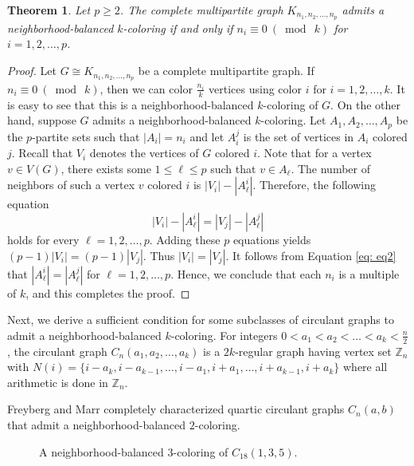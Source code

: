 \documentclass[12pt]{article}
\newtheorem{theorem}{Theorem}[section]
\newcommand{\nbc}{neighborhood-balanced $k$-coloring\xspace}
\begin{document}
\begin{theorem}\label{th:multipartite}
Let $p \geq 2$.
The complete multipartite graph $K_{n_1,n_2,\dots,n_p}$ admits a \nbc if and only if $n_i\equiv 0\ (\bmod\ k)$ for $i=1,2, \dots, p$.
\end{theorem}
\begin{proof}
    Let $G \cong K_{n_1,n_2,\dots,n_p}$ be a complete multipartite graph. 
    If $n_i \equiv 0\ (\bmod\ k)$, then we can color $\tfrac{n_i}{k}$ vertices using color $i$ for $i = 1, 2, \dots, k$.
    It is easy to see that this is a \nbc of $G$.
    On the other hand, suppose $G$ admits a \nbc. Let $A_1,A_2,\dots, A_p$ be the $p$-partite sets such that $|A_i|=n_i$ and let $A_{i}^{j}$ is the set of vertices in $A_i$ colored $j$.
    Recall that $V_i$ denotes the vertices of $G$ colored $i$.
    Note that for a vertex $v \in V(G)$, there exists some $1 \le \ell \le p$ such that $v \in A_{\ell}$.
    The number of neighbors of such a vertex $v$ colored $i$ is $|V_i| - |A_{\ell}^{i}|$.
    Therefore, the following equation
    \begin{equation}\label{eq: eq2}
        |V_i| - |A_{\ell}^{i}| = |V_j| - |A_{\ell}^{j}|
    \end{equation}
    holds for every $\ell = 1, 2,  \dots, p$.
    Adding these $p$ equations yields $(p-1) |V_i| =(p-1) |V_j|$.
    Thus $|V_i| = |V_j|$.
    It follows from Equation \ref{eq: eq2} that $|A_{\ell}^{i}| = |A_{\ell}^{j}|$ for $\ell = 1, 2, \dots, p$.
    Hence, we conclude that each $n_i$ is a multiple of $k$, and this completes the proof.
\end{proof}

Next, we derive a sufficient condition for some subclasses of circulant graphs to admit a \nbc.
For integers $0 < a_1 < a_2 < \dots <a_k< \frac{n}{2}$, the circulant graph $C_n(a_1,a_2,\dots,a_k)$ is a $2k$-regular graph having vertex set $\mathbb{Z}_n$ with $N(i)=\{i-a_k, i-a_{k-1},\dots,i-a_1, i+a_1, \dots, i+a_{k-1},i+a_k \}$ where all arithmetic is done in $\mathbb{Z}_n$.
\par
Freyberg and Marr \cite{nbc} completely characterized quartic circulant graphs $C_n(a,b)$ that admit a neighborhood-balanced $2$-coloring.

\begin{figure}[htbp]
\centering

\caption{A neighborhood-balanced $3$-coloring of $C_{18}(1,3,5)$.}
\label{fig: 3nbc_of_c18(1,3,5)}
\end{figure}
\end{document}
